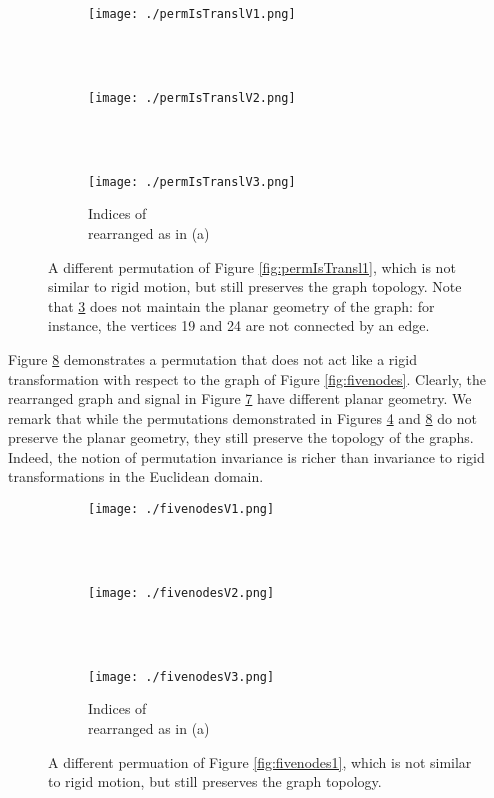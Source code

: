 \documentclass{article}
\begin{document}
\begin{figure}[!ht]
\centering
\begin{subfigure}{.25\textwidth}
	\centering
    \texttt{[image: ./permIsTranslV1.png]}
    \caption{ \\ ~ }
\label{fig:permIsTranslV1}
\end{subfigure}
{\large}\begin{subfigure}{.25\textwidth}
	\centering
    \texttt{[image: ./permIsTranslV2.png]}
    \caption{ \\ ~ }
\label{fig:permIsTranslV2}
\end{subfigure}
{\large}\begin{subfigure}{.25\textwidth}
	\centering
    \texttt{[image: ./permIsTranslV3.png]}
    \caption{Indices of  \\ rearranged as in (a)}
\label{fig:permIsTranslV3}
\end{subfigure}
\caption{{A different permutation of Figure \ref{fig:permIsTransl1}, which is not similar to rigid motion, but still preserves the graph topology. Note that \ref{fig:permIsTranslV3} does not maintain the planar geometry of the graph: for instance, the vertices 19 and 24 are not connected by an edge. }}
\label{fig:permIsTranslV}
\end{figure}

{Figure \ref{fig:fivenodesV} demonstrates a permutation that does not act like a rigid transformation with respect to the graph of Figure \ref{fig:fivenodes}. Clearly, the rearranged graph and signal in Figure \ref{fig:fivenodesV3} have different planar geometry. We remark that while the permutations demonstrated in Figures \ref{fig:permIsTranslV} and \ref{fig:fivenodesV} do not preserve the planar geometry, they still preserve the topology of the graphs. Indeed, the notion of permutation invariance is richer than invariance to rigid transformations in the Euclidean domain.}


\begin{figure}[!ht]
\centering
\begin{subfigure}{.25\textwidth}
	\centering
    \texttt{[image: ./fivenodesV1.png]}
    \caption{ \\ ~ }
\label{fig:fivenodesV1}
\end{subfigure}
{\large}\begin{subfigure}{.25\textwidth}
	\centering
    \texttt{[image: ./fivenodesV2.png]}
    \caption{ \\ ~ }
\label{fig:fivenodesV2}
\end{subfigure}
{\large}\begin{subfigure}{.25\textwidth}
	\centering
    \texttt{[image: ./fivenodesV3.png]}
    \caption{Indices of  \\ rearranged as in (a)}
\label{fig:fivenodesV3}
\end{subfigure}
\caption{{A different permuation of Figure \ref{fig:fivenodes1}, which is not similar to rigid motion, but still preserves the graph topology.}}
\label{fig:fivenodesV}
\end{figure}
\end{document}
